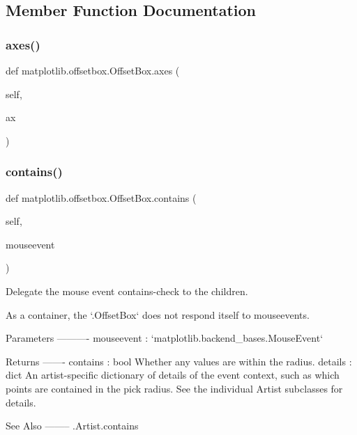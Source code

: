 \subsection{Member Function Documentation}
\mbox{\label{classmatplotlib_1_1offsetbox_1_1OffsetBox_a79e3ba52516a180b57a1349dd2db486f}} 
\subsubsection{\texorpdfstring{axes()}{axes()}}
{\footnotesize\ttfamily def matplotlib.\+offsetbox.\+Offset\+Box.\+axes (\begin{DoxyParamCaption}\item[{}]{self,  }\item[{}]{ax }\end{DoxyParamCaption})}

\mbox{\label{classmatplotlib_1_1offsetbox_1_1OffsetBox_a28fe165606bcae5360f7eaf73fc4b436}} 
\subsubsection{\texorpdfstring{contains()}{contains()}}
{\footnotesize\ttfamily def matplotlib.\+offsetbox.\+Offset\+Box.\+contains (\begin{DoxyParamCaption}\item[{}]{self,  }\item[{}]{mouseevent }\end{DoxyParamCaption})}

\begin{DoxyVerb}Delegate the mouse event contains-check to the children.

As a container, the `.OffsetBox` does not respond itself to
mouseevents.

Parameters
----------
mouseevent : `matplotlib.backend_bases.MouseEvent`

Returns
-------
contains : bool
    Whether any values are within the radius.
details : dict
    An artist-specific dictionary of details of the event context,
    such as which points are contained in the pick radius. See the
    individual Artist subclasses for details.

See Also
--------
.Artist.contains
\end{DoxyVerb}
 \mbox{\label{classmatplotlib_1_1offsetbox_1_1OffsetBox_a33d9e36393e193723db8a14436391526}} 
